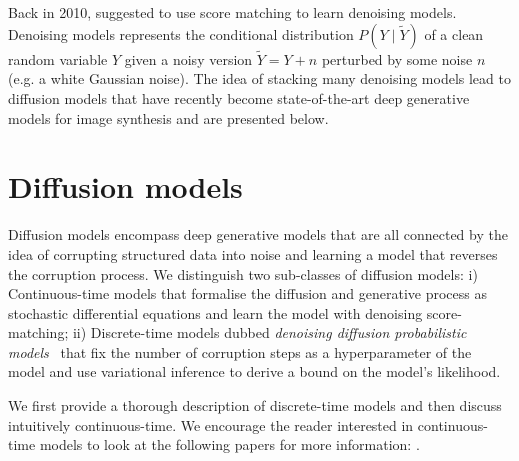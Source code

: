 Back in 2010, \citet{vincent2011connection} suggested to use score matching to learn denoising models. Denoising models represents the conditional distribution $P(Y\mid \tilde Y)$ of a clean random variable $Y$ given a noisy version $\tilde{Y} = Y + n$ perturbed by some noise $n$ (e.g. a white Gaussian noise). The idea of stacking many denoising models lead to diffusion models that have recently become state-of-the-art deep generative models for image synthesis and are presented below.
\section{Diffusion models}
Diffusion models encompass deep generative models that are all connected by the idea of corrupting structured data into noise and learning a model that reverses the corruption process. We distinguish two sub-classes of diffusion models: i) Continuous-time models \citep{song_generative_2019, song2020score} that formalise the diffusion and generative process as stochastic differential equations and learn the model with denoising score-matching; ii) Discrete-time models dubbed \textit{denoising diffusion probabilistic models}~\citep[DDPM][]{sohl-dickstein_deep_2015, ho_denoising_2020} that fix the number of corruption steps as a hyperparameter of the model and use variational inference to derive a bound on the model's likelihood.

We first provide a thorough description of discrete-time models and then discuss intuitively continuous-time. We encourage the reader interested in continuous-time models to look at the following papers for more information: \citep{song_generative_2019, song2020score, song2021maximum, dockhorn2021score}.

